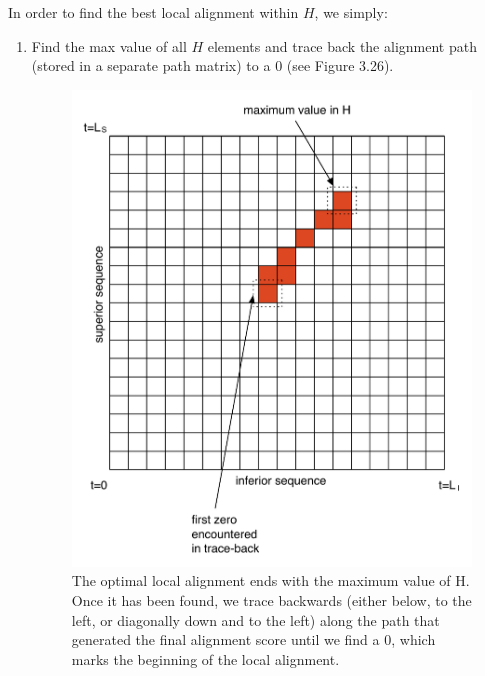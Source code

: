 \documentclass[12pt]{report} 	%
\numberwithin{figure}{chapter}
\numberwithin{table}{chapter}
\numberwithin{equation}{chapter}
\begin{document}
\begin{flushleft}
In order to find the best local alignment within $H$, we simply:
\begin{enumerate}
\item Find the max value of all $H$ elements and trace back the alignment path (stored in a separate path matrix) to a $0$ (see Figure 3.26).
\begin{figure}[h!]
\begin{center}
\includegraphics[scale=0.75]{SIC-DPLA_1}
\caption[Finding the optimal subsequence]{The optimal local alignment ends with the maximum value of H. Once it has been found, we trace backwards (either below, to the left, or diagonally down and to the left) along the path that generated the final alignment score until we find a $0$, which marks the beginning of the local alignment.}
\end{center}
\end{figure}


\end{enumerate}
\end{flushleft}
\end{document}
